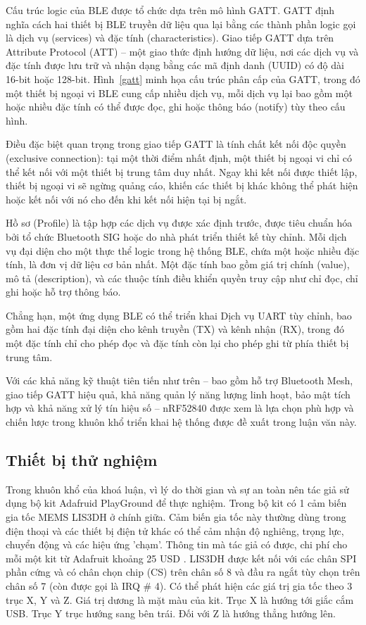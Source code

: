 Cấu trúc logic của BLE được tổ chức dựa trên mô hình GATT. GATT định nghĩa cách hai thiết bị BLE truyền dữ liệu qua lại bằng các thành phần logic gọi là dịch vụ (services) và đặc tính (characteristics). Giao tiếp GATT dựa trên Attribute Protocol (ATT) – một giao thức định hướng dữ liệu, nơi các dịch vụ và đặc tính được lưu trữ và nhận dạng bằng các mã định danh (UUID) có độ dài 16-bit hoặc 128-bit. Hình~\ref{gatt} minh họa cấu trúc phân cấp của GATT, trong đó một thiết bị ngoại vi BLE cung cấp nhiều dịch vụ, mỗi dịch vụ lại bao gồm một hoặc nhiều đặc tính có thể được đọc, ghi hoặc thông báo (notify) tùy theo cấu hình.

Điều đặc biệt quan trọng trong giao tiếp GATT là tính chất kết nối độc quyền (exclusive connection): tại một thời điểm nhất định, một thiết bị ngoại vi chỉ có thể kết nối với một thiết bị trung tâm duy nhất. Ngay khi kết nối được thiết lập, thiết bị ngoại vi sẽ ngừng quảng cáo, khiến các thiết bị khác không thể phát hiện hoặc kết nối với nó cho đến khi kết nối hiện tại bị ngắt.

Hồ sơ (Profile) là tập hợp các dịch vụ được xác định trước, được tiêu chuẩn hóa bởi tổ chức Bluetooth SIG hoặc do nhà phát triển thiết kế tùy chỉnh. Mỗi dịch vụ đại diện cho một thực thể logic trong hệ thống BLE, chứa một hoặc nhiều đặc tính, là đơn vị dữ liệu cơ bản nhất. Một đặc tính bao gồm giá trị chính (value), mô tả (description), và các thuộc tính điều khiển quyền truy cập như chỉ đọc, chỉ ghi hoặc hỗ trợ thông báo.

Chẳng hạn, một ứng dụng BLE có thể triển khai Dịch vụ UART tùy chỉnh, bao gồm hai đặc tính đại diện cho kênh truyền (TX) và kênh nhận (RX), trong đó một đặc tính chỉ cho phép đọc và đặc tính còn lại cho phép ghi từ phía thiết bị trung tâm.

Với các khả năng kỹ thuật tiên tiến như trên – bao gồm hỗ trợ Bluetooth Mesh, giao tiếp GATT hiệu quả, khả năng quản lý năng lượng linh hoạt, bảo mật tích hợp và khả năng xử lý tín hiệu số – nRF52840 được xem là lựa chọn phù hợp và chiến lược trong khuôn khổ triển khai hệ thống được đề xuất trong luận văn này.


\subsection{Thiết bị thử nghiệm}
Trong khuôn khổ của khoá luận, vì lý do thời gian và sự an toàn nên tác giả sử dụng bộ kit Adafruid PlayGround để thực nghiệm. Trong bộ kit có 1 cảm biến gia tốc MEMS LIS3DH ở chính giữa. Cảm biến gia tốc này thường dùng trong điện thoại và các thiết bị điện tử khác có thể cảm nhận độ nghiêng, trọng lực, chuyển động và các hiệu ứng 'chạm'. Thông tin mà tác giả có được, chi phí cho mỗi một kit từ Adafruit khoảng 25 USD \cite{ada_price}. LIS3DH được kết nối với các chân SPI phần cứng và có chân chọn chip (CS) trên chân số 8 và đầu ra ngắt tùy chọn trên chân số 7 (còn được gọi là IRQ \# 4). Có thể phát hiện các giá trị gia tốc theo 3 trục X, Y và Z. Giá trị dương là mặt màu của kit. Trục X là hướng tới giắc cắm USB. Trục Y trục hướng sang bên trái. Đối với Z là hướng thẳng hướng lên.


